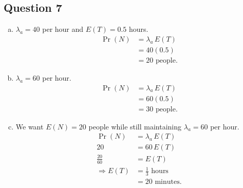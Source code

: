 \documentclass[12pt]{article}
\begin{document}
{\begin{minipage}[t]{0.98\textwidth}
\begin{minipage}[t]{0.47\textwidth}
\subsection*{Question 7}
\begin{enumerate}[a)]
\item $\lambda_a = 40$ per hour and $E(T) = 0.5$ hours.
\begin{align*}
\Pr(N) &= \lambda_a \, E(T) \\
&= 40(0.5)\\
&= 20 \text{ people.}
\end{align*}
\item $\lambda_a = 60$ per hour.
\begin{align*}
\Pr(N) &= \lambda_a \, E(T) \\
&= 60(0.5)\\
&= 30 \text{ people.}
\end{align*}
\item We want $E(N) = 20$ people while still maintaining $\lambda_a = 60$ per hour.
\begin{align*}
 \Pr(N) &= \lambda_a \, E(T) \\
20 &= 60\,E(T) \\
\frac{20}{60} &= E(T) \\[0.2cm]
\Rightarrow E(T) &= \frac{1}{3} \text{ hours} \\
&= 20 \text{ minutes}.
\end{align*}
\end{enumerate}
\end{minipage}
\end{minipage}}\vspace{0.03\textwidth}
\end{document}
